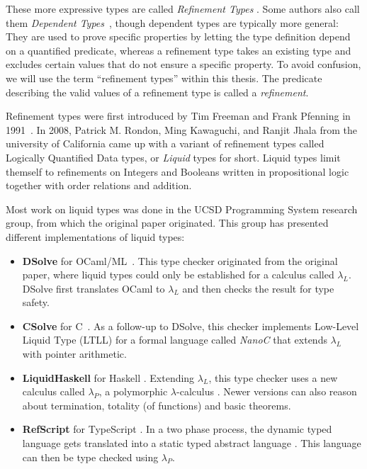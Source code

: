 \documentclass[]{scrbook}
\providecommand{\tightlist}{%
  \setlength{\itemsep}{0pt}\setlength{\parskip}{0pt}}
\theoremstyle{definition}
\theoremstyle{definition}
\theoremstyle{definition}
\theoremstyle{remark}
\begin{document}
These more expressive types are called \emph{Refinement Types}
\autocite{refinement_types_for_ML}. Some authors also call them
\emph{Dependent Types}~\autocite{little_typer}, though dependent types
are typically more general: They are used to prove specific properties
by letting the type definition depend on a quantified predicate, whereas
a refinement type takes an existing type and excludes certain values
that do not ensure a specific property. To avoid confusion, we will use
the term \enquote{refinement types} within this thesis. The predicate
describing the valid values of a refinement type is called a
\emph{refinement}.

Refinement types were first introduced by Tim Freeman and Frank Pfenning
in 1991~\autocite{refinement_types_for_ML}. In 2008, Patrick M. Rondon,
Ming Kawaguchi, and Ranjit Jhala from the university of California came
up with a variant of refinement types called Logically Quantified Data
types, or \emph{Liquid} types for short. Liquid types limit themself to
refinements on Integers and Booleans written in propositional logic
together with order relations and addition.

Most work on liquid types was done in the UCSD Programming System
research group, from which the original paper originated. This group has
presented different implementations of liquid types:

\begin{itemize}
\tightlist
\item
  \textbf{DSolve} for OCaml/ML~\autocite{DSolve}. This type checker
  originated from the original paper, where liquid types could only be
  established for a calculus called \(\lambda_L\). DSolve first
  translates OCaml to \(\lambda_L\) and then checks the result for type
  safety.
\item
  \textbf{CSolve} for C~\autocite{CSolve}. As a follow-up to DSolve,
  this checker implements Low-Level Liquid Type (LTLL) \autocite{LTLL}
  for a formal language called \emph{NanoC} that extends \(\lambda_L\)
  with pointer arithmetic.
\item
  \textbf{LiquidHaskell} for Haskell \autocite{RT_for_Haskell}.
  Extending \(\lambda_L\), this type checker uses a new calculus called
  \(\lambda_P\), a polymorphic \(\lambda\)-calculus
  \autocite{abstract_refinement_types}. Newer versions can also reason
  about termination, totality (of functions) and basic theorems.
\item
  \textbf{RefScript} for TypeScript \autocite{Refined_TypeScript}. In a
  two phase process, the dynamic typed language gets translated into a
  static typed abstract language \autocite{trust_but_verify}. This
  language can then be type checked using \(\lambda_P\).
\end{itemize}
\end{document}
